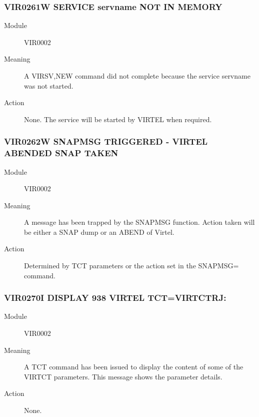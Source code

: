 \documentclass[letterpaper,10pt,english]{sphinxmanual}
\begin{document}
\subsubsection{VIR0261W SERVICE servname NOT IN MEMORY}
\label{\detokenize{messages:vir0261w-service-servname-not-in-memory}}\begin{description}
\item[{Module}] \leavevmode
VIR0002

\item[{Meaning}] \leavevmode
A VIRSV,NEW command did not complete because the service servname was not started.

\item[{Action}] \leavevmode
None. The service will be started by VIRTEL when required.

\end{description}


\subsubsection{VIR0262W SNAPMSG TRIGGERED - VIRTEL ABENDED \textbar{} SNAP TAKEN}
\label{\detokenize{messages:vir0262w-snapmsg-triggered-virtel-abended-snap-taken}}\begin{description}
\item[{Module}] \leavevmode
VIR0002

\item[{Meaning}] \leavevmode
A message has been trapped by the SNAPMSG function. Action taken will be either a SNAP dump or an ABEND of Virtel.

\item[{Action}] \leavevmode
Determined by TCT parameters or the action set in the SNAPMSG= command.

\end{description}


\subsubsection{VIR0270I DISPLAY 938 VIRTEL TCT=VIRTCTRJ:}
\label{\detokenize{messages:vir0270i-display-938-virtel-tct-virtctrj}}\begin{description}
\item[{Module}] \leavevmode
VIR0002

\item[{Meaning}] \leavevmode
A TCT command has been issued to display the content of some of the VIRTCT parameters. This message shows the parameter details.

\item[{Action}] \leavevmode
None.

\end{description}
\end{document}
